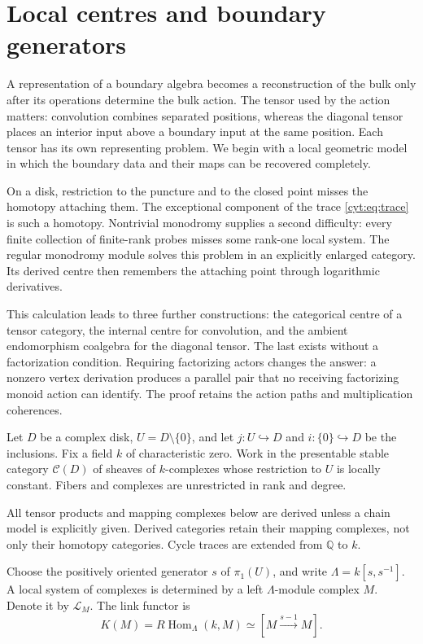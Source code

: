 \chapter{Local centres and boundary generators}
\label{cyp:section}

A representation of a boundary algebra becomes a reconstruction
of the bulk only after its operations determine the bulk action.
The tensor used by the action matters: convolution combines
separated positions, whereas the diagonal tensor places an
interior input above a boundary input at the same position.
Each tensor has its own representing problem. We begin with a
local geometric model in which the boundary data and their
maps can be recovered completely.

On a disk, restriction to the puncture and to the closed point
misses the homotopy attaching them. The exceptional component
of the trace \eqref{cyt:eq:trace} is such a homotopy.
Nontrivial monodromy supplies a second difficulty: every finite
collection of finite-rank probes misses some rank-one local
system. The regular monodromy module solves this problem in
an explicitly enlarged category. Its derived centre then
remembers the attaching point through logarithmic derivatives.

This calculation leads to three further constructions: the
categorical centre of a tensor category, the internal centre
for convolution, and the ambient endomorphism coalgebra for
the diagonal tensor. The last exists without a factorization
condition. Requiring factorizing actors changes the answer:
a nonzero vertex derivation produces a parallel pair that no
receiving factorizing monoid action can identify. The proof
retains the action paths and multiplication coherences.

Let \(D\) be a complex disk, \(U=D\setminus\{0\}\), and
let \(j:U\hookrightarrow D\) and \(i:\{0\}\hookrightarrow D\)
be the inclusions. Fix a field \(k\) of characteristic zero.
Work in the presentable stable category \(\mathcal C(D)\)
of sheaves of \(k\)-complexes whose restriction to \(U\)
is locally constant. Fibers and complexes are unrestricted
in rank and degree.

All tensor products and mapping complexes
below are derived unless a chain model is explicitly given.
Derived categories retain their mapping complexes, not only
their homotopy categories.
Cycle traces are extended from \(\mathbb Q\) to \(k\).

Choose the positively oriented generator \(s\) of
\(\pi_1(U)\), and write \(\Lambda=k[s,s^{-1}]\).
A local system of complexes is determined by a left
\(\Lambda\)-module complex \(M\). Denote it by
\(\mathcal L_M\). The link functor is
\begin{equation}\label{cyp:eq:link}
 K(M)=R\operatorname{Hom}_{\Lambda}(k,M)
        \simeq[M\xrightarrow{s-1}M].
\end{equation}


